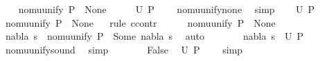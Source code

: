 \begin{isabellebody}
%
\isadelimproof
%
\endisadelimproof
%
\isatagproof
{}\isamarkupfalse%
\isanewline
\ \ \isamarkupfalse%
\ {\isachardoublequoteopen}nomu{\isacharunderscore}{\kern0pt}unify\ P\ {\isacharequal}{\kern0pt}\ None{\isachardoublequoteclose}\isanewline
\ \ \isamarkupfalse%
\ \isamarkupfalse%
\ {\isachardoublequoteopen}U\ P\ {\isacharequal}{\kern0pt}\ {\isacharbraceleft}{\kern0pt}{\isacharbraceright}{\kern0pt}{\isachardoublequoteclose}\ \isamarkupfalse%
\ nomu{\isacharunderscore}{\kern0pt}unify{\isacharunderscore}{\kern0pt}none\ \isamarkupfalse%
\ simp\isanewline
{}\isamarkupfalse%
\isanewline
\ \ \isamarkupfalse%
\ {\isachardoublequoteopen}U\ P\ {\isacharequal}{\kern0pt}\ {\isacharbraceleft}{\kern0pt}{\isacharbraceright}{\kern0pt}{\isachardoublequoteclose}\isanewline
\ \ \isamarkupfalse%
\ {\isachardoublequoteopen}nomu{\isacharunderscore}{\kern0pt}unify\ P\ {\isacharequal}{\kern0pt}\ None{\isachardoublequoteclose}\isanewline
\ \ \isamarkupfalse%
{\isacharparenleft}{\kern0pt}rule\ ccontr{\isacharparenright}{\kern0pt}\isanewline
\ \ \ \ \isamarkupfalse%
\ {\isachardoublequoteopen}nomu{\isacharunderscore}{\kern0pt}unify\ P\ {\isasymnoteq}\ None{\isachardoublequoteclose}\isanewline
\ \ \ \ \isamarkupfalse%
\ \isamarkupfalse%
\ nabla\ s\ \ {\isachardoublequoteopen}nomu{\isacharunderscore}{\kern0pt}unify\ P\ {\isacharequal}{\kern0pt}\ Some\ {\isacharparenleft}{\kern0pt}nabla{\isacharcomma}{\kern0pt}\ s{\isacharparenright}{\kern0pt}{\isachardoublequoteclose}\ \isamarkupfalse%
\ auto\isanewline
\ \ \ \ \isamarkupfalse%
\ \isamarkupfalse%
\ {\isachardoublequoteopen}{\isacharparenleft}{\kern0pt}nabla{\isacharcomma}{\kern0pt}\ s{\isacharparenright}{\kern0pt}\ {\isasymin}\ U\ P{\isachardoublequoteclose}\ \isamarkupfalse%
\ nomu{\isacharunderscore}{\kern0pt}unify{\isacharunderscore}{\kern0pt}sound\ \isamarkupfalse%
\ simp\isanewline
\ \ \ \ \isamarkupfalse%
\ \isamarkupfalse%
\ False\ \isamarkupfalse%
\ {\isacartoucheopen}U\ P\ {\isacharequal}{\kern0pt}\ {\isacharbraceleft}{\kern0pt}{\isacharbraceright}{\kern0pt}{\isacartoucheclose}\ \isamarkupfalse%
\ simp\isanewline
\ \ \isamarkupfalse%
\isanewline

\end{isabellebody}
